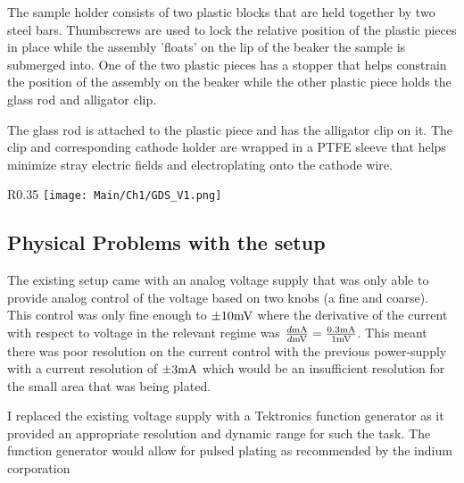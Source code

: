 
The sample holder consists of two plastic blocks that are held together by two steel bars. Thumbscrews are used to lock the relative position of the plastic pieces in place while the assembly 'floats'  on the lip of the beaker the sample is submerged into. One of the two plastic pieces has a stopper that helps constrain the position of the assembly on the beaker while the other plastic piece holds the glass rod and alligator clip.

The glass rod is attached to the plastic piece and has the alligator clip on it. The clip and corresponding cathode holder are wrapped in a PTFE sleeve that helps minimize stray electric fields and electroplating onto the cathode wire.


\begin{wrapfigure}{R}{0.35\textwidth}
    \centering
    \texttt{[image: Main/Ch1/GDS\_V1.png]}
    \caption{GDS image of the layout. Indium is in green bumps have a diameter of 40 $\um$}
    \label{fig:gds_ch1}
    \vspace{.2cm}
\end{wrapfigure}


\subsection{Physical Problems with the setup}

The existing setup came with an analog voltage supply that was only able to provide analog control of the voltage based on two knobs (a fine and coarse). This control was only fine enough to $\pm 10 \mV$ where the derivative of the current with respect to voltage in the relevant regime was $\frac{d \mA}{d \mV} = \frac{0.3 \mA}{1 \mV}$.
This meant there was poor resolution on the current control with the previous power-supply with a current resolution of $\pm 3 \mA$ which would be an insufficient resolution for the small area that was being plated.

I replaced the existing voltage supply with a Tektronics function generator as it provided an appropriate resolution and dynamic range for such the task.
The function generator would allow for pulsed plating as recommended by the indium corporation \cite{indiumCorpGrainStructure}

